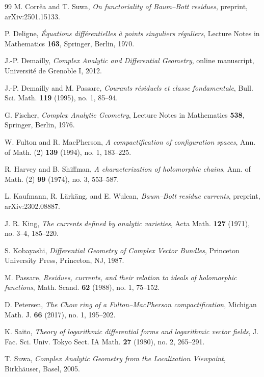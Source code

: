 \documentclass[12pt,a4paper,dvipsnames,x11names]{amsart}
\numberwithin{equation}{section}
\theoremstyle{plain}
\theoremstyle{definition}
\theoremstyle{remark}
\begin{document}
\begin{thebibliography}{99}
M. Corr\^ea and T. Suwa,
\emph{On functoriality of Baum--Bott residues},
preprint, arXiv:2501.15133.

P. Deligne,
\emph{\'Equations diff\'erentielles \`a points singuliers r\'eguliers},
Lecture Notes in Mathematics \textbf{163},
Springer, Berlin, 1970.

J.-P. Demailly,
\emph{Complex Analytic and Differential Geometry},
online manuscript, Universit\'e de Grenoble I, 2012.

J.-P. Demailly and M. Passare,
\emph{Courants r\'esiduels et classe fondamentale},
Bull. Sci. Math. \textbf{119} (1995), no. 1, 85--94.

G. Fischer,
\emph{Complex Analytic Geometry},
Lecture Notes in Mathematics \textbf{538},
Springer, Berlin, 1976.

W. Fulton and R. MacPherson,
\emph{A compactification of configuration spaces},
Ann. of Math. (2) \textbf{139} (1994), no. 1, 183--225.

R. Harvey and B. Shiffman,
\emph{A characterization of holomorphic chains},
Ann. of Math. (2) \textbf{99} (1974), no. 3, 553--587.

L. Kaufmann, R. L\"ark\"ang, and E. Wulcan,
\emph{Baum--Bott residue currents},
preprint, arXiv:2302.08887.

J. R. King,
\emph{The currents defined by analytic varieties},
Acta Math. \textbf{127} (1971), no. 3--4, 185--220.

S. Kobayashi,
\emph{Differential Geometry of Complex Vector Bundles},
Princeton University Press, Princeton, NJ, 1987.

M. Passare,
\emph{Residues, currents, and their relation to ideals of holomorphic functions},
Math. Scand. \textbf{62} (1988), no. 1, 75--152.

D. Petersen,
\emph{The Chow ring of a Fulton--MacPherson compactification},
Michigan Math. J. \textbf{66} (2017), no. 1, 195--202.

K. Saito,
\emph{Theory of logarithmic differential forms and logarithmic vector fields},
J. Fac. Sci. Univ. Tokyo Sect. IA Math. \textbf{27} (1980), no. 2, 265--291.

T. Suwa,
\emph{Complex Analytic Geometry from the Localization Viewpoint},
Birkh\"auser, Basel, 2005.



\end{thebibliography}
\end{document}
